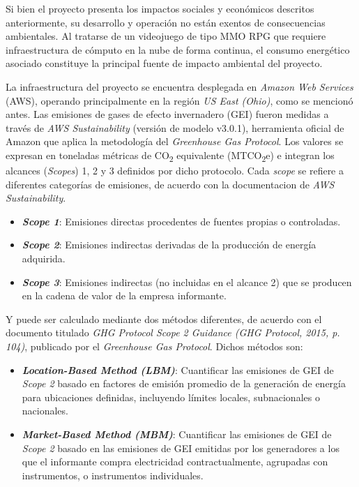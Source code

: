 Si bien el proyecto presenta los impactos sociales y económicos descritos anteriormente, su desarrollo y operación no 
están exentos de consecuencias ambientales. Al tratarse de un videojuego de tipo MMO RPG que requiere infraestructura de 
cómputo en la nube de forma continua, el consumo energético asociado constituye la principal fuente de impacto ambiental 
del proyecto.
\vspace{0.25cm}

La infraestructura del proyecto se encuentra desplegada en \textit{Amazon Web Services} (AWS), operando principalmente en 
la región \textit{US East (Ohio)}, como se mencionó antes. Las emisiones de gases de efecto invernadero (GEI) fueron 
medidas a través de \textit{AWS Sustainability} (versión de modelo v3.0.1), herramienta oficial de Amazon que aplica la 
metodología del \textit{Greenhouse Gas Protocol}. Los valores se expresan en toneladas métricas de CO\textsubscript{2} 
equivalente (MTCO\textsubscript{2}e) e integran los alcances (\textit{Scopes}) 1, 2 y 3 definidos por dicho protocolo. 
Cada \textit{scope} se refiere a diferentes categorías de emisiones, de acuerdo con la documentacion de \textit{AWS Sustainability}.
\vspace{0.25cm}

\begin{itemize}
  \item \textbf{\textit{Scope 1}}: Emisiones directas procedentes de fuentes propias o controladas.
  \item \textbf{\textit{Scope 2}}: Emisiones indirectas derivadas de la producción de energía adquirida.
  \item \textbf{\textit{Scope 3}}: Emisiones indirectas (no incluidas en el alcance 2) que se producen en la cadena de valor de la 
  empresa informante.
\end{itemize}

Y puede ser calculado mediante dos métodos diferentes, de acuerdo con el documento titulado \textit{GHG Protocol Scope 2 Guidance (GHG Protocol, 2015, p. 104)},
publicado por el \textit{Greenhouse Gas Protocol}. Dichos métodos son:
\vspace{0.25cm}

\begin{itemize}
  \item \textbf{\textit{Location-Based Method (LBM)}}: Cuantificar las emisiones de GEI de \textit{Scope 2} basado en factores de emisión 
  promedio de la generación de energía para ubicaciones definidas, incluyendo límites locales, subnacionales o nacionales.
  \item \textbf{\textit{Market-Based Method (MBM)}}: Cuantificar las emisiones de GEI de \textit{Scope 2} basado en las emisiones de GEI emitidas 
  por los generadores a los que el informante compra electricidad contractualmente, agrupadas con instrumentos, o instrumentos individuales.
\end{itemize}

